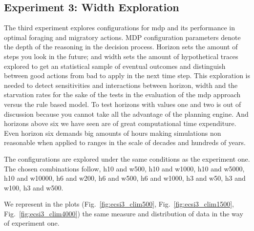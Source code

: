 \documentclass[11pt,oneside,a4paper,openright]{report}
\begin{document}

\subsection{Experiment 3: Width Exploration}
\label{sec:expEcsi3}
The third experiment explores configurations for mdp and its performance in optimal foraging and migratory actions. MDP configuration parameters denote the depth of the reasoning in the decision process. 
Horizon sets the amount of steps you look in the future; and width sets the amount of hypothetical traces explored to get an statistical sample of eventual outcomes and distinguish between good actions from bad to apply in the next time step. 
This exploration is needed  to detect sensitivities and interactions between horizon, width and the starvation rates for the sake of the tests in the evaluation of the mdp approach versus the rule based model. 
To test horizons with values one and  two is out of discussion because you cannot take all the advantage of the planning engine. And horizons above six we have seen are of great computational time expenditure. Even horizon six demands big amounts of hours making simulations non reasonable when applied to ranges in the scale of decades and hundreds of years.

The configurations are explored under the same conditions as the experiment one. The chosen combinations follow, h10 and w500, h10 and w1000, h10 and w5000, h10 and w10000, h6 and w200, h6 and w500, h6 and w1000, h3 and w50, h3 and w100, h3 and w500.


We represent in the plots (Fig.~\ref{fig:ecsi3_clim500}, Fig.~\ref{fig:ecsi3_clim1500}, Fig.~\ref{fig:ecsi3_clim4000}) the same measure and distribution of data in the way of experiment one.
\end{document}
